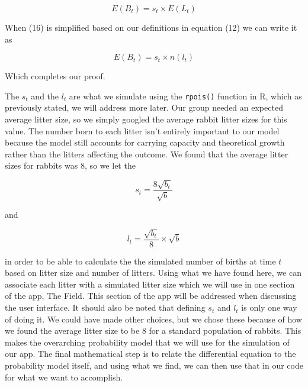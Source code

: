 \documentclass[titlepage]{article}\usepackage[]{graphicx}\usepackage[]{color}
\begin{document}
\begin{equation}
E(B_t) = s_t \times E(L_t)
\end{equation}

\noindent When (16) is simplified based on our definitions  in  equation (12) we can write it as

\begin{equation}
E(B_t) = s_t\times n(l_t)
\end{equation}

\noindent Which completes our proof. 

 The \(s_t\) and the \(l_t\) are what we simulate using the \texttt{rpois()} function in R, which as previously stated, we will address more later. Our group needed an expected average litter size, so we simply googled the average rabbit litter sizes for this value. The number born to each litter isn't entirely important to our model because the model still accounts for carrying capacity and theoretical growth rather than the litters affecting the outcome. We found that the average litter sizes for rabbits was \(8\), so we let the 

\begin{equation}
s_t = \frac{8\sqrt{b_t}}{\sqrt{b}}
\end{equation}

and 

\begin{equation}
l_t = \frac{\sqrt{b_t}}{8}\times \sqrt{b}
\end{equation}

\noindent in order to be able to calculate the the simulated number of births at time \(t\) based on litter size and number of litters. Using what we have found here, we can associate each litter with a simulated litter size which we will use in one section of the app, The Field. This section of the app will be addressed when discussing the user interface. It should also be noted that defining \(s_t\) and \(l_t\) is only one way of doing it. We could have made other choices, but we chose these because of how we found the average litter size to be 8 for a standard population of rabbits. This makes the overarching probability model that we will use for the simulation of our app. The final mathematical step is to relate the differential equation to the probability model itself, and using what we find, we can then use that in our code for what we want to accomplish. 
\end{document}

